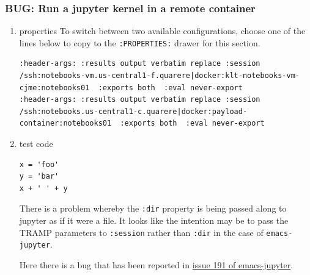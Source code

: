 \documentclass[11pt]{article}
\begin{document}
\subsubsection{BUG: Run a jupyter kernel in a remote container}
\label{sec:orgad1ee4f}
\begin{enumerate}
\item properties
\label{sec:orgf1d9db4}
To switch between two available configurations, choose one of the lines below to copy to the \texttt{:PROPERTIES:} drawer for this section.
\begin{verbatim}
:header-args: :results output verbatim replace :session /ssh:notebooks-vm.us-central1-f.quarere|docker:klt-notebooks-vm-cjme:notebooks01  :exports both  :eval never-export
:header-args: :results output verbatim replace :session /ssh:notebooks.us-central1-c.quarere|docker:payload-container:notebooks01  :exports both  :eval never-export
\end{verbatim}

\item test code
\label{sec:org4d2208f}

\begin{verbatim}
x = 'foo'
y = 'bar'
x + ' ' + y
\end{verbatim}

There is a problem whereby the \texttt{:dir} property is being passed along to jupyter as if it were a file. It looks like the intention may be to pass the TRAMP parameters to \texttt{:session} rather than \texttt{:dir} in the case of \texttt{emacs-jupyter}.

Here there is a bug that has been reported in \href{https://github.com/nnicandro/emacs-jupyter/issues/191}{issue 191 of emacs-jupyter}.


\end{enumerate}
\end{document}

